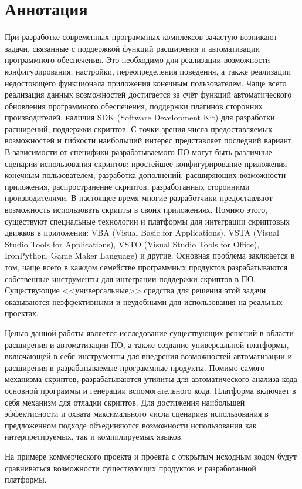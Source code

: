 \setcounter{secnumdepth}{0}
\section*{Аннотация}
\setcounter{secnumdepth}{2}

При разработке современных программных комплексов зачастую возникают задачи, связанные с поддержкой функций расширения и автоматизации программного обеспечения. Это необходимо для реализации возможности конфигурирования, настройки, переопределения поведения, а также реализации недостоющего функционала приложения конечным пользователем. Чаще всего реализация данных возможностей достигается за счёт функций автоматического обновления программного обеспечения, поддержки плагинов сторонних производителей, наличия SDK (Software Development Kit) для разработки расширений, поддержки скриптов. С точки зрения числа предоставляемых возможностей и гибкости наибольший интерес представляет последний вариант. В зависимости от специфики разрабатываемого ПО могут быть различные сценарии использования скриптов: простейшее конфигурирование приложения конечным пользователем, разработка дополнений, расширяющих возможности приложения, распространение скриптов, разработанных сторонними производителями. В настоящее время многие разработчики предоставляют возможность использовать скрипты в своих приложениях. Помимо этого, существуют специальные технологии и платформы для интеграции скриптовых движков в приложения: VBA (Visual Basic for Applications), VSTA (Visual Studio Tools for Applications), VSTO (Visual Studio Tools for Office), IronPython, Game Maker Language) и другие. Основная проблема заклюается в том, чаще всего в каждом семействе программных продуктов разрабатываются собственные инструменты для интеграции поддержки скриптов в ПО. Существующие <<универсальные>> средства для решения этой задачи оказываются неэффективными и неудобными для использования на реальных проектах.

Целью данной работы является исследование существующих решений в области расширения и автоматизации ПО, а также создание универсальной платформы, включающей в себя инструменты для внедрения возможностей автоматизации и расширения в разрабатываемые программные продукты. Помимо самого механизма скриптов, разрабатываются утилиты для автоматического анализа кода основной программы и генерации вспомогательного кода. Платформа включает в себя механизм для отладки скриптов. Для достижения наибольшей эффектисности и охвата максимального числа сценариев использования в предложенном подходе объединяются возможности использования как интерпретируемых, так и компилируемых языков. 

На примере коммерческого проекта и проекта с открытым исходным кодом будут сравниваться возможности существующих продуктов и разработанной платформы. 
\pagebreak